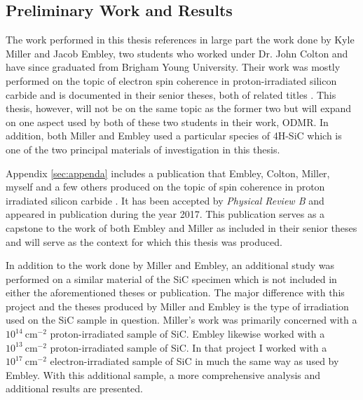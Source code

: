 \documentclass[oneside]{BYUPhys}
\begin{document}
\subsection{Preliminary Work and Results}

The work performed in this thesis references in large part the work done by Kyle Miller and Jacob Embley, two students who worked under Dr. John Colton and have since graduated from Brigham Young University. Their work was mostly performed on the topic of electron spin coherence in proton-irradiated silicon carbide and is documented in their senior theses, both of related titles \cite{RefWorks:doc:5892989ee4b0499fa95c51c8} \cite{RefWorks:doc:5892912ae4b0dec22aee3993}. This thesis, however, will not be on the same topic as the former two but will expand on one aspect used by both of these two students in their work, ODMR. In addition, both Miller and Embley used a particular species of 4H-SiC which is one of the two principal materials of investigation in this thesis.

Appendix \ref{sec:appenda} includes a publication that Embley, Colton, Miller, myself and a few others produced on the topic of spin coherence in proton irradiated silicon carbide \cite{PhysRevB.95.045206}. It has been accepted by \textit{Physical Review B} and appeared in publication during the year 2017. This publication serves as a capstone to the work of both Embley and Miller as included in their senior theses and will serve as the context for which this thesis was produced.

In addition to the work done by Miller and Embley, an additional study was performed on a similar material of the SiC specimen which is not included in either the aforementioned theses or publication. The major difference with this project and the theses produced by Miller and Embley is the type of irradiation used on the SiC sample in question. Miller's work was primarily concerned with a $10^{14}~\text{cm}^{-2}$ proton-irradiated sample of SiC. Embley likewise worked with a $10^{13}~\text{cm}^{-2}$ proton-irradiated sample of SiC. In that project I worked with a $10^{17}~\text{cm}^{-2}$ electron-irradiated sample of SiC in much the same way as used by Embley. With this additional sample, a more comprehensive analysis and additional results are presented.
\end{document}

